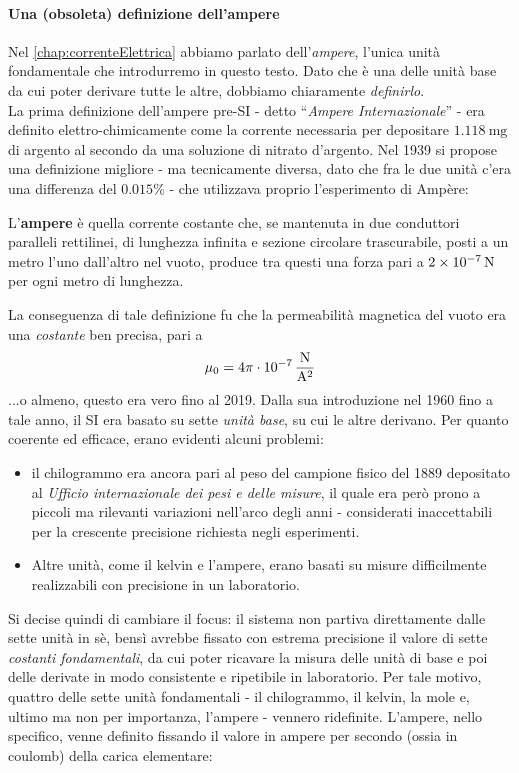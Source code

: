 \paragraph{Una (obsoleta) definizione dell'ampere}
Nel \autoref{chap:correnteElettrica} abbiamo parlato dell'\textit{ampere}, l'unica unità fondamentale che introdurremo in questo testo. Dato che è una delle unità base da cui poter derivare tutte le altre, dobbiamo chiaramente \textit{definirlo}.\\
La prima definizione dell'ampere pre-SI - detto ``\textit{Ampere Internazionale}'' - era definito elettro-chimicamente come la corrente necessaria per depositare $\SI{1.118}{\milli\gram}$ di argento al secondo da una soluzione di nitrato d'argento. Nel 1939 si propose una definizione migliore - ma tecnicamente diversa, dato che fra le due unità c'era una differenza del $0.015\%$ - che utilizzava proprio l'esperimento di Ampère:
\begin{define}[Ampere {(1960)}]
	L'\textbf{ampere} è quella corrente costante che, se mantenuta in due conduttori paralleli rettilinei, di lunghezza infinita e sezione circolare trascurabile, posti a un metro l'uno dall'altro nel vuoto, produce tra questi una forza pari a $\SI{2d-7}{\newton}$ per ogni metro di lunghezza.
\end{define}
La conseguenza di tale definizione fu che la permeabilità magnetica del vuoto era una \textit{costante} ben precisa, pari a
\begin{equation*}
	\mu_0=4\pi\cdot\SI[per-mode = fraction]{d-7}{\newton\per\ampere\squared}
\end{equation*}
...o almeno, questo era vero fino al 2019. Dalla sua introduzione nel 1960 fino a tale anno, il SI era basato su sette \textit{unità base}, su cui le altre derivano. Per quanto coerente ed efficace, erano evidenti alcuni problemi:
\begin{itemize}
	\item il chilogrammo era ancora pari al peso del campione fisico del 1889 depositato al \textit{Ufficio internazionale dei pesi e delle misure}, il quale era però prono a piccoli ma rilevanti variazioni nell'arco degli anni - considerati inaccettabili per la crescente precisione richiesta negli esperimenti.
	\item Altre unità, come il kelvin e l'ampere, erano basati su misure difficilmente realizzabili con precisione in un laboratorio. 
\end{itemize}
Si decise quindi di cambiare il focus: il sistema non partiva direttamente dalle sette unità in sè, bensì avrebbe fissato con estrema precisione il valore di sette \textit{costanti fondamentali}, da cui poter ricavare la misura delle unità di base e poi delle derivate in modo consistente e ripetibile in laboratorio. Per tale motivo, quattro delle sette unità fondamentali - il chilogrammo, il kelvin, la mole e, ultimo ma non per importanza, l'ampere - vennero ridefinite. L'ampere, nello specifico, venne definito fissando il valore in ampere per secondo (ossia in coulomb) della carica elementare:
